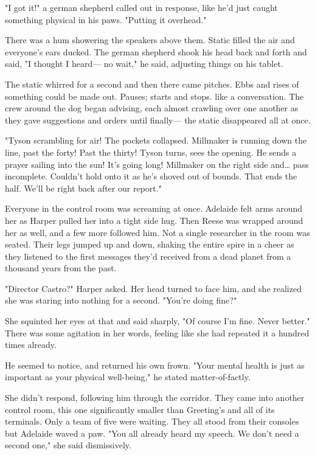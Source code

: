 "I got it!" a german shepherd called out in response, like he'd just caught something physical in his paws. "Putting it overhead."

There was a hum showering the speakers above them. Static filled the air and everyone's ears ducked. The german shepherd shook his head back and forth and said, "I thought I heard--- no wait," he said, adjusting things on his tablet.

The static whirred for a second and then there came pitches. Ebbs and rises of something could be made out. Pauses; starts and stops. like a conversation. The crew around the dog began advising, each almost crawling over one another as they gave suggestions and orders until finally--- the static disappeared all at once.

"Tyson scrambling for air! The pockets collapsed. Millmaker is running down the line, past the forty! Past the thirty! Tyson turns, sees the opening. He sends a prayer sailing into the sun! It's going long! Millmaker on the right side and\ldots{} pass incomplete. Couldn't hold onto it as he's shoved out of bounds. That ends the half. We'll be right back after our report."

Everyone in the control room was screaming at once. Adelaide felt arms around her as Harper pulled her into a tight side hug. Then Reese was wrapped around her as well, and a few more followed him. Not a single researcher in the room was seated. Their legs jumped up and down, shaking the entire spire in a cheer as they listened to the first messages they'd received from a dead planet from a thousand years from the past.

\secdiv

"Director Castro?" Harper asked. Her head turned to face him, and she realized she was staring into nothing for a second. "You're doing fine?"

She squinted her eyes at that and said sharply, "Of course I'm fine. Never better." There was some agitation in her words, feeling like she had repeated it a hundred times already.

He seemed to notice, and returned his own frown. "Your mental health is just as important as your physical well-being," he stated matter-of-factly.

She didn't respond, following him through the corridor. They came into another control room, this one significantly smaller than Greeting's and all of its terminals. Only a team of five were waiting. They all stood from their consoles but Adelaide waved a paw. "You all already heard my speech. We don't need a second one," she said dismissively.

